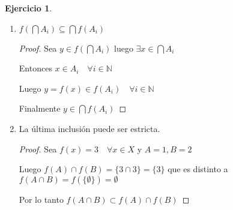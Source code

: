 \documentclass[12pt]{article}
\newcommand{\N}{\mathbb{N}}
\theoremstyle{definition}
\newtheorem{ej}{Ejercicio}
\begin{document}
\begin{ej}
\begin{enumerate}[i.]
\begin{enumerate}
\begin{proof}
        $\supseteq )$ Sea $y \in \bigcup f(A_{i})$ luego $\exists j \in \N $ tal que $y \in f(A_{j})$

	Luego $\exists x \in A_{j} $ tal que $y = f(x)$ luego $x \in \bigcup A_{i}$

	Finalmente $y = f(x) \in f (\bigcup A_{i})$

        \end{proof}

      \item $f(\bigcap A_{i}) \subseteq \bigcap f(A_{i})$
	\begin{proof}
	
	Sea $y \in f(\bigcap A_{i})$ luego $\exists x \in \bigcap A_{i}$

	Entonces $x \in A_{i} \quad \forall i \in \N$

	Luego $y = f(x) \in f(A_{i}) \quad \forall i \in \N$ 

	Finalmente $y \in \bigcap f(A_{i})$

        \end{proof}

      \item La última inclusión puede ser estricta. 
	\begin{proof}

	Sea $f(x) = 3 \quad \forall x \in X$ y $A = {1}, B={2}$

	Luego $f(A) \cap f(B) = \{3 \cap 3\} = \{3\} $ que es distinto a $f(A \cap B) = f(\{\emptyset\}) = \emptyset$

	Por lo tanto $f(A \cap B) \subset f(A) \cap f(B)$

        \end{proof}

     \end{enumerate}
\end{enumerate}
\end{ej}
	
\end{document}
